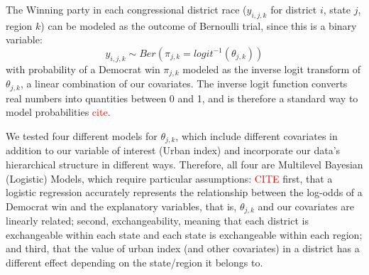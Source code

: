 \documentclass[12pt]{article}
\begin{document}
%
%
%
%

The Winning party in each congressional district race ($y_{i,j,k}$ for district $i$, state $j$, region $k$) can be modeled as the outcome of Bernoulli trial, since this is a binary variable: 
\begin{equation}
	y_{i,j,k} \sim Ber \left( \pi_{j,k} = logit^{-1}(\theta_{j,k})  \right)
\end{equation}
with probability of a Democrat win $\pi_{j,k}$ modeled as the inverse logit transform of $\theta_{j,k}$, a linear combination of our covariates. The inverse logit function converts real numbers into quantities between 0 and 1, and is therefore a standard way to model probabilities \textcolor{red}{cite}.


We tested four different models for $\theta_{j,k}$, which include different covariates in addition to our variable of interest (Urban index) and incorporate our data's hierarchical structure in different ways. Therefore, all four are Multilevel Bayesian (Logistic) Models, which require particular assumptions: \textcolor{red}{CITE} 
first, that a logistic regression accurately represents the relationship between the log-odds of a Democrat win and the explanatory variables, that is, $\theta_{j,k}$ and our covariates are linearly related; second, exchangeability, meaning that each district is exchangeable within each state and each state is exchangeable within each region; and third, that the value of urban index (and other covariates) in a district has a different effect depending on the state/region it belongs to.
\end{document}
